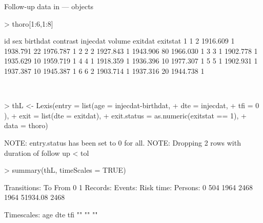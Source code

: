 \begin{frame}{Follow-up data in  ---  objects}
\begin{Schunk}
\begin{Sinput}
> thoro[1:6,1:8]
\end{Sinput}
\begin{Soutput}
  id sex birthdat contrast injecdat volume  exitdat exitstat
1  1   2 1916.609        1 1938.791     22 1976.787        1
2  2   2 1927.843        1 1943.906     80 1966.030        1
3  3   1 1902.778        1 1935.629     10 1959.719        1
4  4   1 1918.359        1 1936.396     10 1977.307        1
5  5   1 1902.931        1 1937.387     10 1945.387        1
6  6   2 1903.714        1 1937.316     20 1944.738        1
\end{Soutput}
\end{Schunk}
\ \\[-1em]
\begin{Schunk}
\begin{Sinput}
> thL <- Lexis(entry = list(age = injecdat-birthdat,
+                           dte = injecdat,
+                           tfi = 0 ),
+               exit = list(dte = exitdat),
+        exit.status = as.numeric(exitstat == 1),
+               data = thoro)
\end{Sinput}
\begin{Soutput}
NOTE: entry.status has been set to 0 for all.
NOTE: Dropping  2  rows with duration of follow up < tol
\end{Soutput}
\begin{Sinput}
> summary(thL, timeScales = TRUE)
\end{Sinput}
\begin{Soutput}
Transitions:
     To
From   0    1  Records:  Events: Risk time:  Persons:
   0 504 1964      2468     1964   51934.08      2468

Timescales:
age dte tfi 
 ""  ""  "" 
\end{Soutput}
\end{Schunk}
\end{frame}

